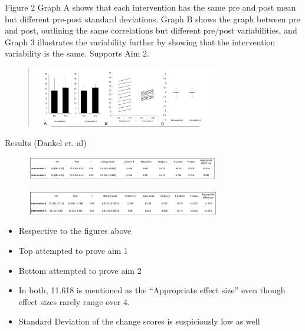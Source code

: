 \documentclass[
  ignorenonframetext,
  aspectratio=169,
]{beamer}
\providecommand{\tightlist}{%
  \setlength{\itemsep}{0pt}\setlength{\parskip}{0pt}}
\begin{document}
\begin{frame}{Figure 2}
\protect\hypertarget{figure-2-1}{}
Graph A shows that each intervention has the same pre and post mean but
different pre-post standard deviations. Graph B shows the graph between
pre and post, outlining the same correlations but different pre/post
variabilities, and Graph 3 illustrates the variability further by
showing that the intervention variability is the same. Supports Aim 2.

\begin{figure}[h]
    \centering
    \includegraphics[width=0.75\textwidth]{fig2.png}
\end{figure}
\end{frame}

\begin{frame}{Results (Dankel et. al)}
\protect\hypertarget{results-dankel-et.-al}{}
\begin{figure}[h]
    \centering
    \includegraphics[width=0.75\textwidth]{figresult1.png}
\end{figure}

\begin{figure}[h]
    \centering
    \includegraphics[width=0.75\textwidth]{figresult2.png}
\end{figure}

\begin{itemize}
\tightlist
\item
  Respective to the figures above
\item
  Top attempted to prove aim 1
\item
  Bottom attempted to prove aim 2
\item
  In both, 11.618 is mentioned as the ``Appropriate effect size'' even
  though effect sizes rarely range over 4.
\item
  Standard Deviation of the change scores is suspiciously low as well
\end{itemize}
\end{frame}
\end{document}
